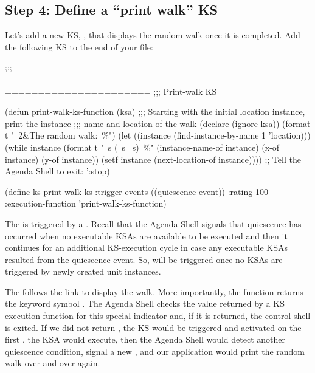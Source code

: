 \documentclass[10pt,twoside,english,pdftex]{article}
\begin{document}
\subsection*{Step 4: Define a ``print walk'' KS}

%
%
%
%
%
Let's add a new KS, , that displays the random walk
once it is completed. Add the following KS to the end of your
 file:
%
\W\supp
\begin{example}
  ;;; ====================================================================
  ;;;   Print-walk KS

  (defun print-walk-ks-function (ksa)
    ;;; Starting with the initial location instance, print the instance 
    ;;; name and location of the walk
    (declare (ignore ksa))
    (format t "~2\&The random walk:~\%")
    (let ((instance (find-instance-by-name 1 'location)))
      (while instance
        (format t "~s (~s ~s)~\%"
                (instance-name-of instance)
                (x-of instance)
                (y-of instance))
        (setf instance (next-location-of instance))))
    ;; Tell the Agenda Shell to exit:
    ':stop)

  (define-ks print-walk-ks
    :trigger-events ((quiescence-event))
    :rating 100
    :execution-function 'print-walk-ks-function)
\end{example}
%
The  is triggered by a
.  Recall that the Agenda Shell signals that
quiescence has occurred when no executable KSAs are available to be executed
and then it continues for an additional KS-execution cycle in case any
executable KSAs resulted from the quiescence event.  So,
 will be triggered once no
 KSAs are triggered by newly created
 unit instances.

The  follows the
 link to display the walk.
More importantly, the function returns the keyword symbol .  The
Agenda Shell checks the value returned by a KS execution function for this
special indicator and, if it is returned, the control shell is exited.  If we
did not return , the  KS would be
triggered and activated on the first , the KSA
would execute, then the Agenda Shell would detect another quiescence
condition, signal a new , and our application
would print the random walk over and over again.
\end{document}
